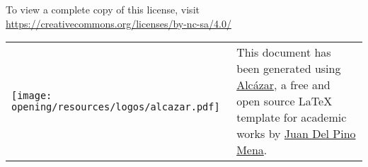     \noindent To view a complete copy of this license, visit 
    \href{https://creativecommons.org/licenses/by-nc-sa/4.0/}{https://creativecommons.org/licenses/by-nc-sa/4.0/}

\endgroup

\vspace*{5mm}


\begingroup

    \setlength\tabcolsep{0pt}
    \renewcommand*{\arraystretch}{1.4}
    \renewcommand{\baselinestretch}{1}\footnotesize  %
    
    \noindent
    \begin{tabular}{m{3.5cm} m{11.5cm}}
        \texttt{[image: opening/resources/logos/alcazar.pdf]} & 
        \noindent This document has been generated using {\href{https://github.com/dpmj/alcazar}{Alcázar}}, a free and open source {\LaTeX} template for academic works by \href{https://www.linkedin.com/in/dpmj/}{Juan Del Pino Mena}. \\
    \end{tabular}

\endgroup

